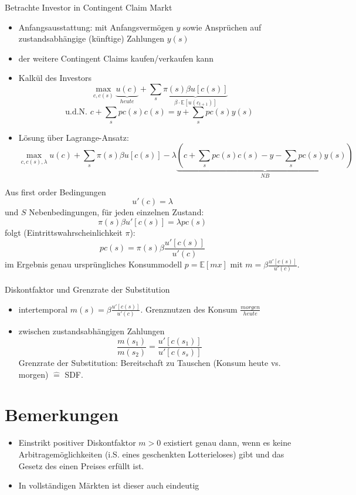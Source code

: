 \documentclass[12pt]{extreport} %
\theoremstyle{named}
\theoremstyle{nnamed}
\theoremstyle{itshape}
\theoremstyle{normal}
\begin{document}
Betrachte Investor in Contingent Claim Markt
\begin{itemize}
	\item Anfangsausstattung: mit Anfangsvermögen $y$ sowie Ansprüchen auf zustandsabhängige (künftige) Zahlungen $y(s)$
	\item der weitere Contingent Claims kaufen/verkaufen kann
	\item Kalkül des Investors
		$$ \max_{c, c(s)} \underbrace{u(c)}_{heute} + \sum_s \underbrace{\pi(s) \beta u[c(s)]}_{\beta \cdot \mathbb{E}[u(c_{t+1})]} $$
		$$ \text{u.d.N. } c + \sum_s pc(s) c(s) = y + \sum_s pc(s) y(s) $$
	\item Lösung über Lagrange-Ansatz:
		$$ \max_{c,c(s),\lambda} u(c) + \sum_{s} \pi(s) \beta u[c(s)] - \lambda \underbrace{\left( c + \sum_s pc(s) c(s) - y - \sum_s pc(s) y(s) \right)}_{NB} $$
\end{itemize}

Aus first order Bedingungen 
	$$ u'(c) = \lambda $$
und $S$ Nebenbedingungen, für jeden einzelnen Zustand:
	$$ \pi(s) \beta u'[c(s)] = \lambda pc(s) $$
folgt (Eintrittswahrscheinlichkeit $\pi$):
	$$ pc(s) = \pi(s) \beta \frac{u'[c(s)]}{u'(c)} $$
	im Ergebnis genau ursprüngliches Konsummodell $p = \mathbb{E}[mx]$ mit $m = \beta \frac{u'[c(s)]}{u'(c)}$. ~\\
	
Diskontfaktor und Grenzrate der Substitution 
\begin{itemize}
	\item intertemporal $m(s) = \beta \frac{u'[c(s)]}{u'(c)}$. Grenznutzen des Konsum $\frac{morgen}{heute}$
	\item zwischen zustandsabhängigen Zahlungen
		$$ \frac{m(s_1)}{m(s_2)} = \frac{u'[c(s_1)]}{u'[c(s_s)]} $$
		Grenzrate der Substitution: Bereitschaft zu Tauschen (Konsum heute vs. morgen) $\hat{=}$ SDF.
\end{itemize}

\section*{Bemerkungen}

\begin{itemize}
	\item Einstrikt positiver Diskontfaktor $m > 0$ existiert genau dann, wenn es keine Arbitragemöglichkeiten (i.S. eines geschenkten Lotterieloses) gibt und das Gesetz des einen Preises erfüllt ist.
	\item In vollständigen Märkten ist dieser auch eindeutig
\end{itemize}
\end{document}
